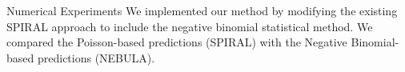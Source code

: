 \documentclass[10pt, t]{beamer}
\begin{document}
\begin{frame}{Numerical Experiments}
We implemented our method by  modifying the existing SPIRAL approach to include the negative binomial statistical method.
We compared the Poisson-based predictions (SPIRAL) with the Negative Binomial-based predictions (NEBULA).

\end{frame}
%
\end{document}
